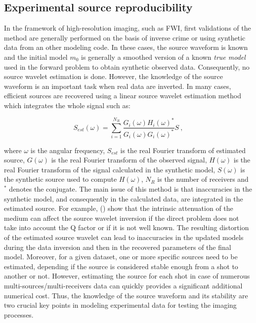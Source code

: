 \documentclass[manuscript,revised]{geophysics}
\begin{document}
\subsection{Experimental source reproducibility}

\noindent In the framework of high-resolution imaging, such as FWI, first validations of the method are generally performed on the basis of inverse crime or using synthetic data from an other modeling code. In these cases, the source waveform is known and the initial model $m_{0}$ is generally a smoothed version of a known \textit{true model} used in the forward problem to obtain synthetic observed data. Consequently, no source wavelet estimation is done. However, the knowledge of the source waveform is an important task when real data are inverted. In many cases, efficient sources are recovered using a linear source wavelet estimation method  \citep{Pratt_FWI_1999} which integrates the whole signal such as:

\begin{equation}
	S_{est}(\omega)=\sum\limits_{i=1}^{N_{R}}\frac{G_{i}(\omega)H_{i}(\omega)^{*}}{G_{i}(\omega)G_{i}(\omega)^{*}}S\ ,
	\label{eq:lswe}
\end{equation}

\noindent where $\omega$ is the angular frequency, $S_{est}$ is the real Fourier transform of estimated source, $G(\omega)$ is the real Fourier transform of the observed signal, $H(\omega)$ is the real Fourier transform of the signal calculated in the synthetic model, $S(\omega)$ is the synthetic source used to compute $H(\omega)$, $N_{R}$ is the number of receivers and $^{*}$ denotes the conjugate. The main issue of this method is that inaccuracies in the synthetic model, and consequently in the calculated data, are integrated in the estimated source. For example, () show that the intrinsic attenuation of the medium can affect the source wavelet inversion if the direct problem does not take into account the Q factor or if it is not well known. The resulting distortion of the estimated source wavelet can lead to inaccuracies in the updated models during the data inversion and then in the recovered parameters of the final model. Moreover, for a given dataset, one or more specific sources need to be estimated, depending if the source is considered stable enough from a shot to another or not. However, estimating the source for each shot in case of numerous multi-sources/multi-receivers data can quickly provides a significant additional numerical cost. Thus, the knowledge of the source waveform and its stability are two crucial key points in modeling experimental data for testing the imaging processes.
\end{document}
